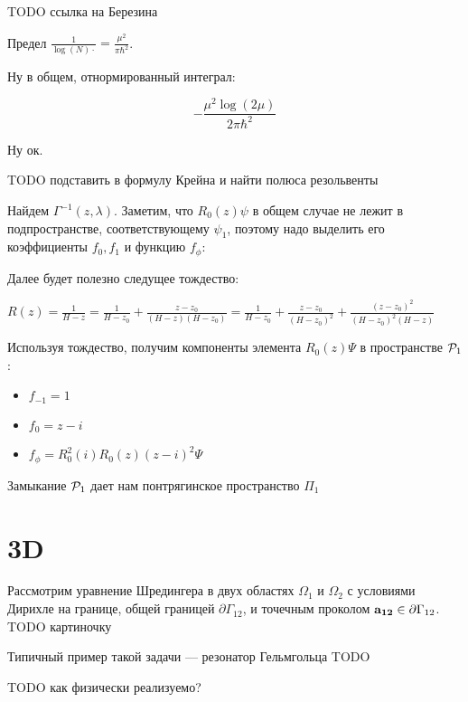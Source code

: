 TODO ссылка на Березина

Предел $\frac{1}{\log(N) \cdot} = \frac{\mu^2}{\pi \hbar^2}$.

Ну в общем, отнормированный интеграл:

\[
-\frac{\mu^2 \log (2 \mu)}{2 \pi  \hbar ^2}
\]

Ну ок.

TODO подставить в формулу Крейна и найти полюса резольвенты

Найдем $\Gamma^{-1}(z, \lambda)$. Заметим, что $R_0(z) \psi$ в общем случае не лежит в подпространстве, соответствующему $\psi_1$, поэтому надо выделить его коэффициенты $f_0, f_1$ и функцию $f_\phi$:


Далее будет полезно следущее тождество:

$R(z) = \frac{1}{H - z} = \frac{1}{H - z_0} + \frac{z - z_0}{(H - z)(H - z_0)} = \frac{1}{H - z_0} + \frac{z - z_0}{(H - z_0)^2} + \frac{(z - z_0)^2}{(H - z_0)^2 (H - z)}$

Используя тождество, получим компоненты элемента $R_0(z) \Psi$ в пространстве $\mathcal{P}_1$:

\begin{itemize}
\item $f_{-1} = 1$
\item $f_0 = z - i$
\item $f_\phi = R_0^2(i) R_0(z) (z - i)^2 \Psi$
\end{itemize}



Замыкание $\mathcal{P}_1$ дает нам понтрягинское пространство $\Pi_1$


\section{3D}
Рассмотрим уравнение Шредингера в двух областях $\Omega_1$ и $\Omega_2$ с условиями Дирихле на границе, общей границей $\partial \Gamma_{12}$, и точечным проколом $\vb{a_{12}} \in \partial \Gamma_{12}$. TODO картиночку

Типичный пример такой задачи — резонатор Гельмгольца TODO

TODO как физически реализуемо?

